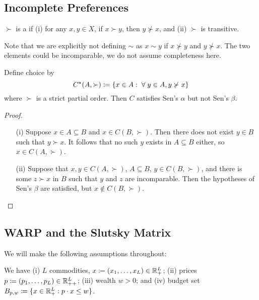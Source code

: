 \documentclass[12pt]{article}
\begin{document}
\subsection{Incomplete Preferences}

\begin{definition}
	$\succ$ is a  if (i) for any $x,y \in X$, if $x \succ y$, then $y \not\succ x$, and (ii) $\succ$ is transitive.
\end{definition}
\begin{remark}
	Note that we are explicitly not defining $\sim$ as $x \sim y$ if $x \not\succ y$ and $y \not\succ x$. The two elements could be incomparable, we do not assume completeness here.
\end{remark}

\begin{proposition}\label{prop:partial_order}
	Define choice by
	\[
	C\opt(A,\succ) \coloneqq \{x \in A : \forall y \in A, y\not\succ x\}
	\]
	where $\succ$ is a strict partial order. Then $C$ satisfies Sen's $\alpha$ but not Sen's $\beta$.
\end{proposition}
\begin{proof}
	
	\begin{itemize}
		\item[(i)] Suppose $x \in A \subseteq B$ and $x \in C(B,\succ)$. Then there does not exist $y \in B$ such that $y \succ x$. It follows that no such $y$ exists in $A \subseteq B$ either, so $x \in C(A,\succ)$.
		
		\item[(ii)] Suppose that $x,y \in C(A,\succ)$, $A \subseteq B$, $y \in C(B,\succ)$, and there is some $z \succ x$ in $B$ such that $y$ and $z$ are incomparable. Then the hypotheses of Sen's $\beta$ are satisfied, but $x \not\in C(B,\succ)$.
	\end{itemize}
\end{proof}

\subsection{WARP and the Slutsky Matrix}

We will make the following assumptions throughout:

\begin{assumption}
	We have (i) $L$ commodities, $x \coloneqq (x_1,\dots,x_L) \in \mathbb{R}^L_+$; (ii) prices $p \coloneqq (p_1,\dots,p_L) \in \mathbb{R}^L_{++}$; (iii) wealth $w > 0$; and (iv) budget set $B_{p,w} \coloneqq \{x \in \mathbb{R}^L_+ : p\cdot x \le w\}$.
\end{assumption}
\end{document}

